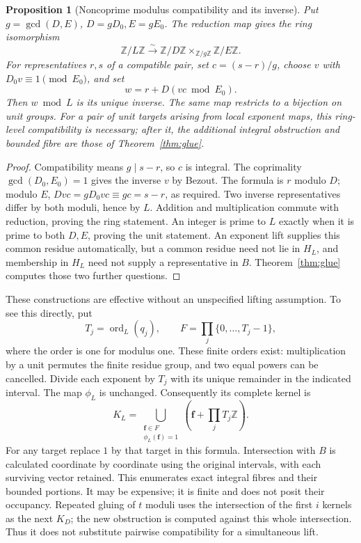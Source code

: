 \documentclass[11pt]{article}
\newtheorem{proposition}[theorem]{Proposition}
\theoremstyle{definition}\newtheorem{definition}[theorem]{Definition}
\theoremstyle{remark}\newtheorem{remark}[theorem]{Remark}
\newcommand{\Z}{\mathbb Z}\newcommand{\Q}{\mathbb Q}
\begin{document}
\begin{proposition}[Noncoprime modulus compatibility and its inverse]\label{prop:crt}
Put \(g=\gcd(D,E)\), \(D=gD_0,E=gE_0\).
The reduction map gives the ring isomorphism
\[
 \Z/L\Z\xrightarrow{\sim}
 \Z/D\Z\times_{\Z/g\Z}\Z/E\Z.
\]
For representatives \(r,s\) of a compatible pair, set
\(c=(s-r)/g\), choose \(v\) with \(D_0v\equiv1\pmod{E_0}\),
and set
\[
 w=r+D(vc\bmod E_0).
\]
Then \(w\bmod L\) is its unique inverse.  The same map restricts
to a bijection on unit groups.  For a pair of unit targets
arising from local exponent maps, this ring-level compatibility
is necessary; after it, the additional integral obstruction
and bounded fibre are those of Theorem~\ref{thm:glue}.
\end{proposition}
\begin{proof}
Compatibility means \(g\mid s-r\), so \(c\) is integral.
The coprimality \(\gcd(D_0,E_0)=1\) gives the inverse \(v\) by
Bezout.  The formula is \(r\) modulo \(D\); modulo \(E\),
\(Dvc=gD_0vc\equiv gc=s-r\), as required.
Two inverse representatives differ by both moduli, hence by \(L\).
Addition and multiplication commute with reduction, proving
the ring statement.  An integer is prime to \(L\) exactly when
it is prime to both \(D,E\), proving the unit statement.
An exponent lift supplies this common residue automatically,
but a common residue need not lie in \(H_L\), and membership
in \(H_L\) need not supply a representative in \(B\).
Theorem~\ref{thm:glue} computes those two further questions.
\end{proof}

These constructions are effective without an unspecified lifting
assumption.  To see this directly, put
\[
 T_j=\operatorname{ord}_{L}(q_j),\qquad
 F=\prod_j\{0,\ldots,T_j-1\},
\]
where the order is one for modulus one.  These finite orders exist:
multiplication by a unit permutes the finite residue group, and
two equal powers can be cancelled.  Divide each exponent by \(T_j\)
with its unique remainder in the indicated interval.  The map
\(\phi_L\) is unchanged.  Consequently its complete kernel is
\[
 K_L=\bigcup_{\substack{\boldsymbol f\in F\\\phi_L(\boldsymbol f)=1}}
       \left(\boldsymbol f+\prod_j T_j\Z\right).
\]
For any target replace \(1\) by that target in this formula.
Intersection with \(B\) is calculated coordinate by coordinate
using the original intervals, with each surviving vector retained.
This enumerates exact integral fibres and their bounded portions.
It may be expensive; it is finite and does not posit their occupancy.
Repeated gluing of \(t\) moduli uses the intersection of the first
\(i\) kernels as the next \(K_D\); the new obstruction is computed
against this whole intersection.  Thus it does not substitute
pairwise compatibility for a simultaneous lift.
\end{document}
